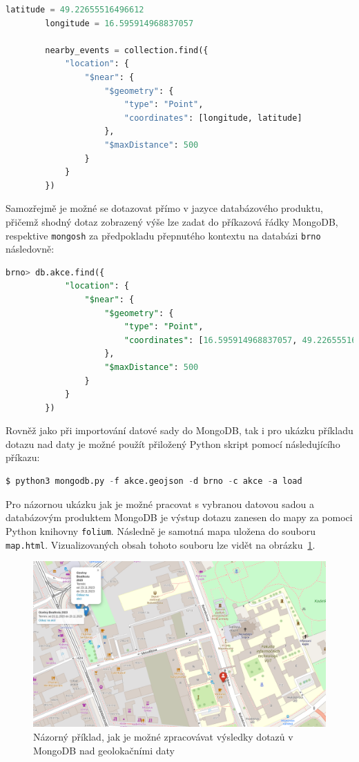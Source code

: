 \documentclass[a4paper, 11pt]{article}
\begin{document}
    \begin{lstlisting}[style=Python, language=Python, framesep=10pt]
        latitude = 49.22655516496612
        longitude = 16.595914968837057
    
        nearby_events = collection.find({
            "location": {
                "$near": {
                    "$geometry": {
                        "type": "Point",
                        "coordinates": [longitude, latitude]
                    },
                    "$maxDistance": 500
                }
            }
        })
    \end{lstlisting}
    Samozřejmě je možné se dotazovat přímo v jazyce databázového produktu, přičemž shodný dotaz zobrazený výše lze zadat do příkazová řádky MongoDB, respektive \texttt{mongosh} za předpokladu přepnutého kontextu na databázi \texttt{brno} následovně: 
    \begin{lstlisting}[style=NoSQL, language=SQL, framesep=10pt]
        brno> db.akce.find({
            "location": { 
                "$near": { 
                    "$geometry": { 
                        "type": "Point", 
                        "coordinates": [16.595914968837057, 49.22655516496612] 
                    }, 
                    "$maxDistance": 500 
                } 
            } 
        })
    \end{lstlisting}
    Rovněž jako při importování datové sady do MongoDB, tak i pro ukázku příkladu dotazu nad daty je možné použít přiložený Python skript pomocí následujícího příkazu:
    \begin{lstlisting}[style=Python, language=Python, framesep=10pt]
        $ python3 mongodb.py -f akce.geojson -d brno -c akce -a load
    \end{lstlisting}
    \newpage
    Pro názornou ukázku jak je možné pracovat s vybranou datovou sadou a databázovým produktem MongoDB je výstup dotazu zanesen do mapy za pomoci Python knihovny \texttt{folium}. Následně je samotná mapa uložena do souboru \texttt{map.html}. Vizualizovaných obsah tohoto souboru lze vidět na obrázku~\ref{MongoDB_map}.
    \begin{figure}[ht!]
        \centering
        \includegraphics[width=1\textwidth]{img/mapa.png}
        \caption{Názorný příklad, jak je možné zpracovávat výsledky dotazů v MongoDB nad geolokačními daty \label{MongoDB_map}}
    \end{figure}
    \newpage
\end{document}
